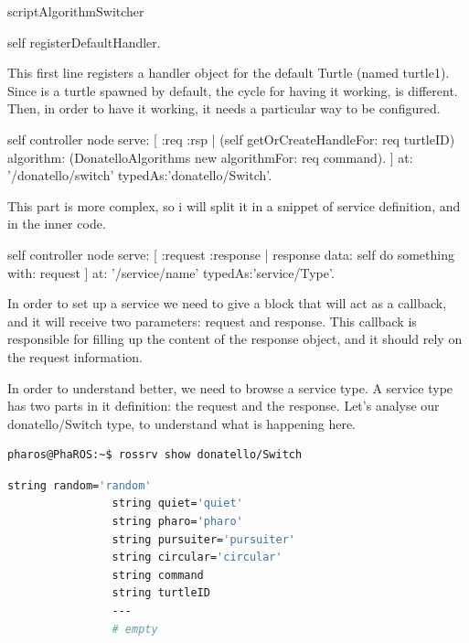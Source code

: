 \documentclass[a4paper,10pt,twoside]{book}
\begin{document}
			\begin{code}

scriptAlgorithmSwitcher

	self registerDefaultHandler.
	
			\end{code}	
			
			This first line registers a handler object for the default Turtle (named turtle1). Since is a turtle spawned by default, the cycle for having it working, is different. Then, in order to have it working, it needs a particular way to be configured.
			
			\begin{code}
	self controller node serve: [ :req :rsp | 
		(self getOrCreateHandleFor: req turtleID)  algorithm: (DonatelloAlgorithms new algorithmFor: req command).		
	] at: '/donatello/switch' typedAs:'donatello/Switch'.

			\end{code}	
			
			This part is more complex, so i will split it in a snippet of service definition, and in the inner code. 
			
			\begin{code}
	self controller node serve: [ :request :response | response data: self do something with: request ] at: '/service/name' typedAs:'service/Type'.

			\end{code}	
			
			In order to set up a service we need to give a block that will act as a callback, and it will receive two parameters: request and response. 
			This callback is responsible for filling up the content of the response object, and it should rely on the request information. 
			
			In order to understand better, we need to browse a service type. A  service type has two parts in it definition: the request and the response.
			Let's analyse our donatello/Switch type, to understand what is happening here. 
			
			
			\begin{lstlisting}[language=bash,title={ Browsing service types }]
				pharos@PhaROS:~$ rossrv show donatello/Switch
			\end{lstlisting}
			
			
			 \begin{lstlisting}[language=bash,title={ donatello/Switch definition }]
				string random='random'
				string quiet='quiet'
				string pharo='pharo'
				string pursuiter='pursuiter'
				string circular='circular'
				string command
				string turtleID
				---
				# empty
			\end{lstlisting}
			
\end{document}
